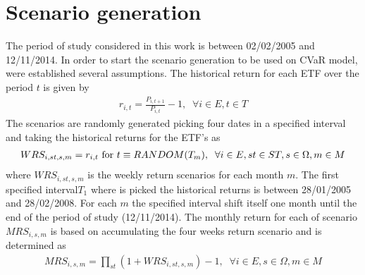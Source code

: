 \section{Scenario generation}

The period of study considered in this work is  between 02/02/2005 and 12/11/2014. In order to start the scenario generation to be used on CVaR model, were established several assumptions. The historical return for each ETF over the period $t$ is given by
\begin{gather}
r_{i,t} = \frac{P_{i,t+1}}{P_{i,t}}-1, \;\; \forall i \in E, t \in T
\end{gather}
The scenarios are randomly generated picking four dates in a specified interval and taking the historical returns for the ETF's as
\begin{gather}
WRS_{i,st,s,m} = r_{i,t}  \textup{ for } t \equiv RANDOM(T_{m}), \;\; \forall i \in E, st \in ST, s \in \Omega, m \in M
\end{gather}
where $WRS_{i,st,s,m}$ is the weekly return scenarios for each month $m$. The first specified interval$T_1$ where is picked the historical returns is between 28/01/2005 and 28/02/2008. For each $m$ the specified interval shift itself one month until the end of the period of study (12/11/2014). The monthly return for each of scenario $MRS_{i,s,m}$ is based on accumulating the four weeks return scenario and is determined as
\begin{gather}
MRS_{i,s,m} = \prod_{st} (1+WRS_{i,st,s,m}) -1, \;\; \forall i \in E, s \in \Omega, m \in M
\end{gather}
